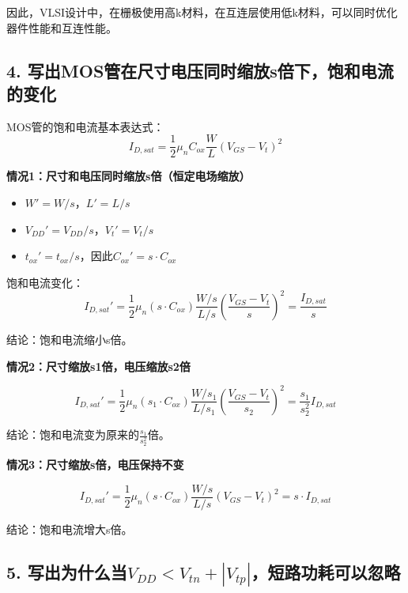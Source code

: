 \documentclass[UTF8,12pt,a4paper]{ctexart}
\begin{document}
因此，VLSI设计中，在栅极使用高k材料，在互连层使用低k材料，可以同时优化器件性能和互连性能。

\subsection*{4. 写出MOS管在尺寸电压同时缩放s倍下，饱和电流的变化}

MOS管的饱和电流基本表达式：
\begin{equation}
I_{D,sat} = \frac{1}{2} \mu_n C_{ox} \frac{W}{L} (V_{GS} - V_t)^2
\end{equation}

\textbf{情况1：尺寸和电压同时缩放s倍（恒定电场缩放）}

\begin{itemize}
    \item $W' = W/s$，$L' = L/s$
    \item $V_{DD}' = V_{DD}/s$，$V_t' = V_t/s$
    \item $t_{ox}' = t_{ox}/s$，因此$C_{ox}' = s \cdot C_{ox}$
\end{itemize}

饱和电流变化：
\begin{equation}
I_{D,sat}' = \frac{1}{2} \mu_n (s \cdot C_{ox}) \frac{W/s}{L/s} \left(\frac{V_{GS} - V_t}{s}\right)^2 = \frac{I_{D,sat}}{s}
\end{equation}

结论：饱和电流缩小s倍。

\textbf{情况2：尺寸缩放s1倍，电压缩放s2倍}

\begin{equation}
I_{D,sat}' = \frac{1}{2} \mu_n (s_1 \cdot C_{ox}) \frac{W/s_1}{L/s_1} \left(\frac{V_{GS} - V_t}{s_2}\right)^2 = \frac{s_1}{s_2^2} I_{D,sat}
\end{equation}

结论：饱和电流变为原来的$\frac{s_1}{s_2^2}$倍。

\textbf{情况3：尺寸缩放s倍，电压保持不变}

\begin{equation}
I_{D,sat}' = \frac{1}{2} \mu_n (s \cdot C_{ox}) \frac{W/s}{L/s} (V_{GS} - V_t)^2 = s \cdot I_{D,sat}
\end{equation}

结论：饱和电流增大s倍。

\subsection*{5. 写出为什么当$V_{DD} < V_{tn} + |V_{tp}|$，短路功耗可以忽略}
\end{document}

